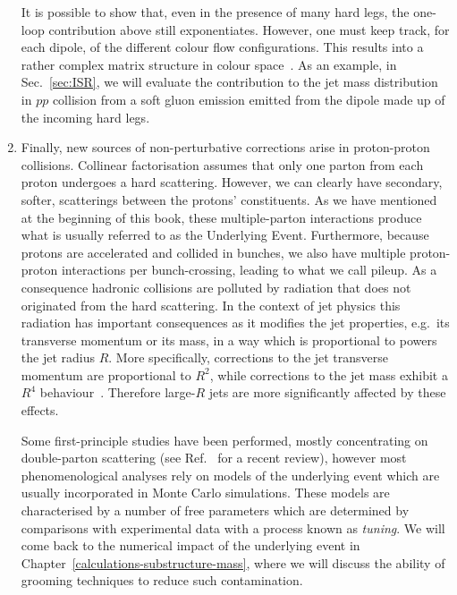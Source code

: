 \begin{enumerate}[label=\alph*)]
It is possible to show that, even in the presence of many hard legs, the one-loop contribution above still exponentiates. However, one must keep track, for each dipole, of the different colour flow configurations. This results into a rather complex matrix structure in colour space~\cite{Catani:1996yz,Kidonakis:1998nf}.
%
As an example, in Sec.~\ref{sec:ISR}, we will evaluate the contribution to the jet mass distribution in $pp$ collision from a soft gluon emission emitted from the dipole made up of the incoming hard legs.


\item Finally, new sources of non-perturbative corrections arise in proton-proton collisions. Collinear factorisation assumes that only one parton from each proton undergoes a hard scattering. However, we can clearly have secondary, softer, scatterings between the protons' constituents. As we have mentioned at the beginning of this book, these multiple-parton interactions produce what is usually referred to as the Underlying Event. Furthermore, because protons are accelerated and collided in bunches, we also have multiple proton-proton interactions per bunch-crossing, leading to what we call pileup.
%
As a consequence hadronic collisions are polluted by radiation that
does not originated from the hard scattering. In the context of jet
physics this radiation has important consequences as it modifies the
jet properties, e.g.\ its transverse momentum or its mass, in a way
which is proportional to powers the jet radius $R$.
More specifically, corrections to the jet transverse momentum are proportional to $R^2$, while corrections to the jet mass exhibit a $R^4$ behaviour~\cite{Dasgupta:2007wa}.
%
Therefore large-$R$ jets are more significantly affected by these effects.

Some first-principle studies have been performed, mostly concentrating on double-parton scattering (see Ref.~\cite{Diehl:2017wew} for a recent review), however most phenomenological analyses rely on models of the underlying event which are usually incorporated in Monte Carlo simulations. These models are characterised by a number of free parameters which are determined by comparisons with experimental data with a process known as \emph{tuning}. We will come back to the numerical impact of the underlying event in Chapter~\ref{calculations-substructure-mass}, where we will discuss the ability of grooming techniques to reduce such contamination.

\end{enumerate} 

